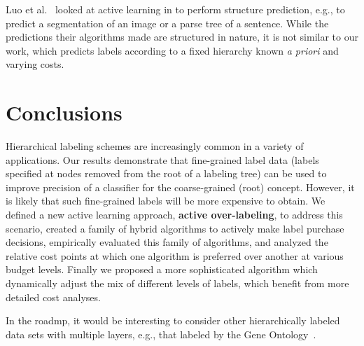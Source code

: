 \documentclass[10pt,conference,compsocconf]{IEEEtran}
\begin{document}
Luo et al.~\cite{lsu-lsal-13} looked at active learning in to perform structure
prediction, e.g., to predict a segmentation of an image or a parse tree of a
sentence.  While the predictions their algorithms made are structured in
nature, it is not similar to our work, which predicts labels according to a
fixed hierarchy known {\em a priori} and varying costs.

\section{Conclusions}
\label{sec:concl}

Hierarchical labeling schemes are increasingly common in a variety
of applications.  Our results demonstrate that fine-grained label
data (labels specified at nodes removed from the root of a labeling
tree) can be used to improve precision of a classifier for the
coarse-grained (root) concept.  However, it is likely that such
fine-grained labels will be more expensive to obtain.  We defined
a new active learning approach, {\bf active over-labeling}, to address this scenario, created a family of
hybrid algorithms to actively make label purchase decisions, 
empirically evaluated this family of algorithms, and analyzed the 
relative cost points at which one algorithm is preferred over another
at various budget levels. Finally we proposed a more sophisticated algorithm which dynamically adjust the
mix of different levels of labels, which benefit from more detailed cost analyses.

In the roadmp, it would be
interesting to consider other hierarchically labeled data sets with multiple layers, e.g.,
that labeled by the Gene Ontology~\cite{GeneOntology}.





%
%
\end{document}
